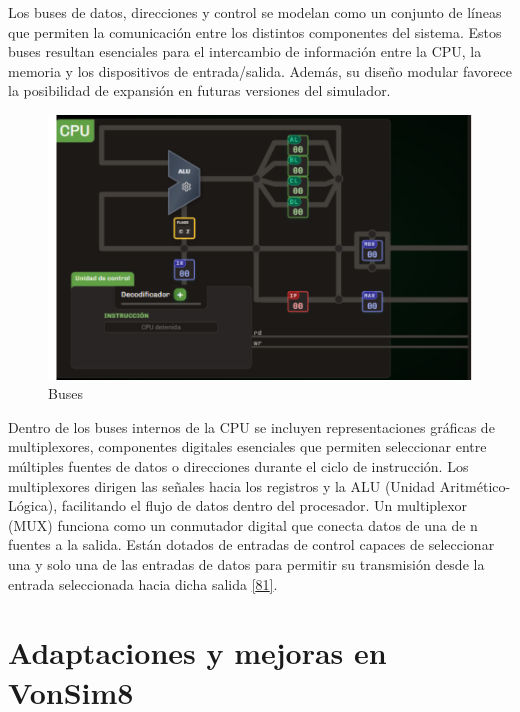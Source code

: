 \documentclass[12pt,oneside]{templates/unerthesis}
\begin{document}
Los buses de datos, direcciones y control se modelan como un conjunto de líneas que permiten la comunicación entre los distintos componentes del sistema. Estos buses resultan esenciales para el intercambio de información entre la CPU, la memoria y los dispositivos de entrada/salida. Además, su diseño modular favorece la posibilidad de expansión en futuras versiones del simulador.

\begin{figure}

{\centering \includegraphics[width=1\linewidth]{images/buses} 

}

\caption{Buses}\label{fig:buses}
\end{figure}

Dentro de los buses internos de la CPU se incluyen representaciones gráficas de multiplexores, componentes digitales esenciales que permiten seleccionar entre múltiples fuentes de datos o direcciones durante el ciclo de instrucción. Los multiplexores dirigen las señales hacia los registros y la ALU (Unidad Aritmético-Lógica), facilitando el flujo de datos dentro del procesador. Un multiplexor (MUX) funciona como un conmutador digital que conecta datos de una de n fuentes a la salida. Están dotados de entradas de control capaces de seleccionar una y solo una de las entradas de datos para permitir su transmisión desde la entrada seleccionada hacia dicha salida \protect\hyperlink{ref-mano2017digital}{{[}81{]}}.

\hypertarget{adaptaciones-y-mejoras-en-vonsim8}{%
\section{Adaptaciones y mejoras en VonSim8}\label{adaptaciones-y-mejoras-en-vonsim8}}
\end{document}
